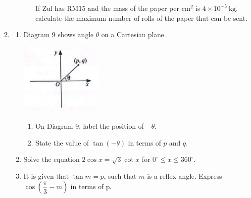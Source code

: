 \documentclass{report}
\begin{document}
\begin{enumerate}[leftmargin=*]
\begin{enumerate}
\begin{enumerate}
                              If Zul has RM15 and the mass of the paper per $\mathrm{cm}^2$ is $4 \times
                                  10^{-5} \mathrm{~kg}$, calculate the maximum number of rolls of the paper that
                              can be sent.
                    \end{enumerate}
          \end{enumerate}

    \item \begin{enumerate}
              \item Diagram 9 shows angle $\theta$ on a Cartesian plane.
                    \begin{center}
                        \includegraphics[width=0.33\textwidth]{./assets/p1.13a.png}
                    \end{center}
                    \begin{enumerate}
                        \item On Diagram 9, label the position of $-\theta$.
                        \item State the value of $\tan (-\theta)$ in terms of $p$ and $q$.
                    \end{enumerate}

              \item Solve the equation $2 \cos x=\sqrt{3} \cot x$ for $0^{\circ} \leqslant x
                        \leqslant 360^{\circ}$.

              \item It is given that $\tan m=p$, such that $m$ is a reflex angle. Express $\cos
                        \left(\dfrac{\pi}{3}-m\right)$ in terms of p.
          \end{enumerate}


\end{enumerate}
\end{document}
